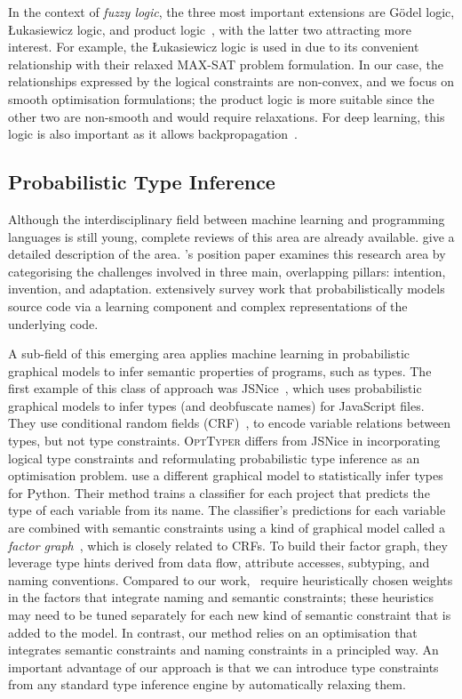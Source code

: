 \documentclass[acmsmall,nonacm]{acmart}\settopmatter{printfolios=true,printccs=false,printacmref=false}
\newcommand{\projectname}{\textsc{OptTyper}\xspace}
\begin{document}
In the context of \textit{fuzzy logic}, the three most
important extensions are G{\"o}del logic, {\L}ukasiewicz logic, and product logic~\cite{hajek98}, with the latter two attracting more interest. For example, the {\L}ukasiewicz logic is used in \citet{bach17} due 
to its convenient relationship with their relaxed MAX-SAT problem formulation. In our case, the relationships expressed by the logical constraints are non-convex, and we focus on smooth optimisation formulations; the product logic is more
suitable since the other two are non-smooth and 
would require relaxations. For 
deep learning, this logic is also important as it 
allows backpropagation~\cite{evans18}.

\subsection{Probabilistic Type Inference}\label{sec:ml:over:source}

Although the interdisciplinary field between machine learning and programming
languages is still young, complete reviews of this area are
already available.
\citet{vechev16} give a detailed description of the area.
\citet{threepillars}'s position paper examines this research area by categorising
the challenges involved in three main, overlapping pillars: intention, invention, and adaptation.
\citet{allamanis17} extensively survey work that probabilistically models source code via a learning component and complex representations of the underlying code.

A sub-field of this emerging area applies machine learning in probabilistic graphical models to infer semantic properties of programs, such as types.
The first example of this class
of approach was
JSNice~\citep{raychev15}, which uses probabilistic graphical models to infer types (and deobfuscate names) for JavaScript files. 
They use conditional random fields (CRF)~\cite{sutton12}, to encode variable relations between types, but not type constraints. 
\projectname differs from JSNice in incorporating logical type constraints and reformulating  probabilistic type inference as an optimisation problem.
\citet{xu16} use a different  graphical model to statistically infer types for Python. 
Their method trains a
classifier for each project that predicts the
type of each variable from its name.
The classifier's predictions for each variable are combined with semantic constraints using a kind of graphical model called a \emph{factor graph}~\citep{yedidia2003}, which is
closely related to CRFs.
To build their factor graph, they leverage type hints
derived from data flow, attribute accesses, subtyping, and naming conventions. Compared to our work,~\citet{xu16} require
heuristically chosen weights in the factors that integrate naming and semantic constraints; these heuristics may need to be tuned separately for each new kind of semantic constraint that is added to the model. In contrast, our method relies on an optimisation that integrates semantic constraints
and naming constraints in a principled way.
An important advantage of our approach
is that we can introduce type constraints from any standard type inference engine by automatically relaxing them.
\end{document}
